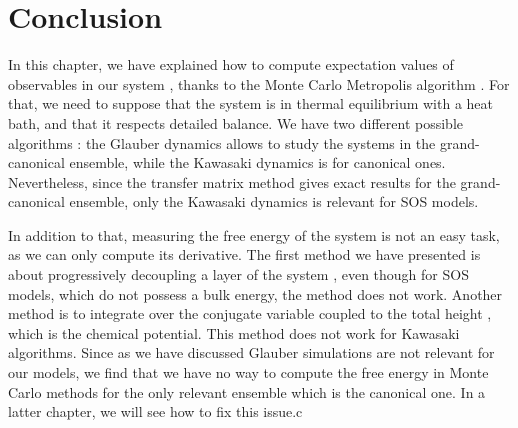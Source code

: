 \section{Conclusion}

In this chapter, we have explained how to compute expectation values of observables in our system \cite{newman_monte_1999}, thanks to the Monte Carlo Metropolis algorithm \cite{metropolis_monte_1949}. For that, we need to suppose that the system is in thermal equilibrium with a heat bath, and that it respects detailed balance. We have two different possible algorithms : the Glauber dynamics \cite{glauber_timedependent_1963} allows to study the systems in the grand-canonical ensemble, while the Kawasaki dynamics \cite{kawasaki_diffusion_1966} is for canonical ones. Nevertheless, since the transfer matrix method gives exact results for the grand-canonical ensemble, only the Kawasaki dynamics is relevant for SOS models. 

In addition to that, measuring the free energy of the system is not an easy task, as we can only compute its derivative. The first method we have presented is about progressively decoupling a layer of the system \cite{vasilyev_universal_2009}, even though for SOS models, which do not possess a bulk energy, the method does not work. Another method is to integrate over the conjugate variable coupled to the total height \cite{lopes_cardozo_critical_2014}, which is the chemical potential. This method does not work for Kawasaki algorithms. 
Since as we have discussed Glauber simulations are not relevant for our models, we find that we have no way to compute the free energy in Monte Carlo methods for the only relevant ensemble which is the canonical one. In a latter chapter, we will see how to fix this issue.c